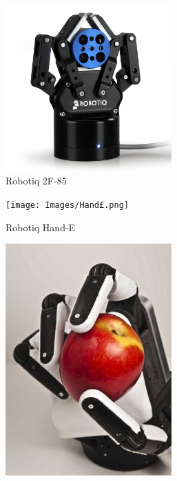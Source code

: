 \begin{figure}
\begin{subfigure}{.3\linewidth}
\includegraphics[width=0.7\textwidth]{Images/Robotiq-2-Finger-85-encompassing-grip.png}
        \caption[Robotiq 2F-85]{Robotiq 2F-85 \cite{RobotIQ2Fingerpic}}
        \label{label:Robotiq85}
    \end{subfigure}
    \begin{subfigure}{.3\linewidth}
        \centering
        \texttt{[image: Images/Hand£.png]}          
        \caption[Robotiq Hand-E]{Robotiq Hand-E \cite{RobotIQHandEpic}}
        \label{label:Hand-E}
    \end{subfigure}
    \begin{subfigure}{.3\linewidth}
        \centering
        \includegraphics[width=0.7\textwidth]{Images/Sandia.jpg}       

\end{subfigure}
\end{figure}
